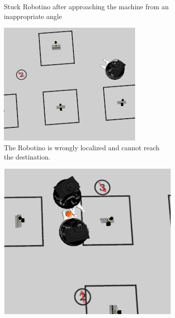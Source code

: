 \begin{figure}
\begin{subfigure}[b]{0.38\textwidth}
    \caption{Stuck Robotino after approaching the machine from an inappropriate angle}
    \label{fig:fails_angle}
  \end{subfigure}
  \begin{subfigure}[b]{0.38\textwidth}
    \includegraphics[width=\textwidth, height=\textwidth]{pics/p1_p2_wrong_localization_block_ins}
    \caption{The Robotino is wrongly localized and cannot reach the destination.}
    \label{fig:fails_localization}
  \end{subfigure}
  \begin{subfigure}[b]{0.38\textwidth}
    \includegraphics[width=\textwidth, height=\textwidth]{pics/crash_p3_p3_wrong_localization}

\end{subfigure}
\end{figure}
